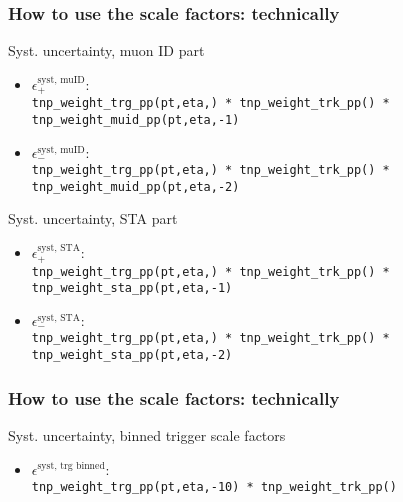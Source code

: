 \documentclass[9pt]{beamer}
\begin{document}
 
  \begin{frame}[plain]
  \frametitle{How to use the scale factors: technically}
  
    \begin{block}{Syst. uncertainty, muon ID part}
  \begin{itemize}
   \item \alert{$\epsilon^\text{syst, muID}_{+}$}: \\\texttt{tnp\_weight\_trg\_pp(pt,eta,) * tnp\_weight\_trk\_pp() * tnp\_weight\_\alert{muid}\_pp(pt,eta,\alert{-1})}
   
   \item \alert{$\epsilon^\text{syst, muID}_{-}$}: \\\texttt{tnp\_weight\_trg\_pp(pt,eta,) * tnp\_weight\_trk\_pp() * tnp\_weight\_\alert{muid}\_pp(pt,eta,\alert{-2})}
   \end{itemize}
  \end{block}
  
  \begin{block}{Syst. uncertainty, STA part}
  \begin{itemize}
   \item \alert{$\epsilon^\text{syst, STA}_{+}$}: \\\texttt{tnp\_weight\_trg\_pp(pt,eta,) * tnp\_weight\_trk\_pp() * tnp\_weight\_\alert{sta}\_pp(pt,eta,\alert{-1})}
   
   \item \alert{$\epsilon^\text{syst, STA}_{-}$}: \\\texttt{tnp\_weight\_trg\_pp(pt,eta,) * tnp\_weight\_trk\_pp() * tnp\_weight\_\alert{sta}\_pp(pt,eta,\alert{-2})}
   \end{itemize}
  \end{block}

 \end{frame}
 
  \begin{frame}[plain]
  \frametitle{How to use the scale factors: technically}
  
  \begin{block}{Syst. uncertainty, binned trigger scale factors}
  \begin{itemize}
   \item \alert{$\epsilon^\text{syst, trg binned}$}: \\\texttt{tnp\_weight\_trg\_pp(pt,eta,\alert{-10}) * tnp\_weight\_trk\_pp()}
   \end{itemize}
  \end{block}
 \end{frame}
 
\end{document}

